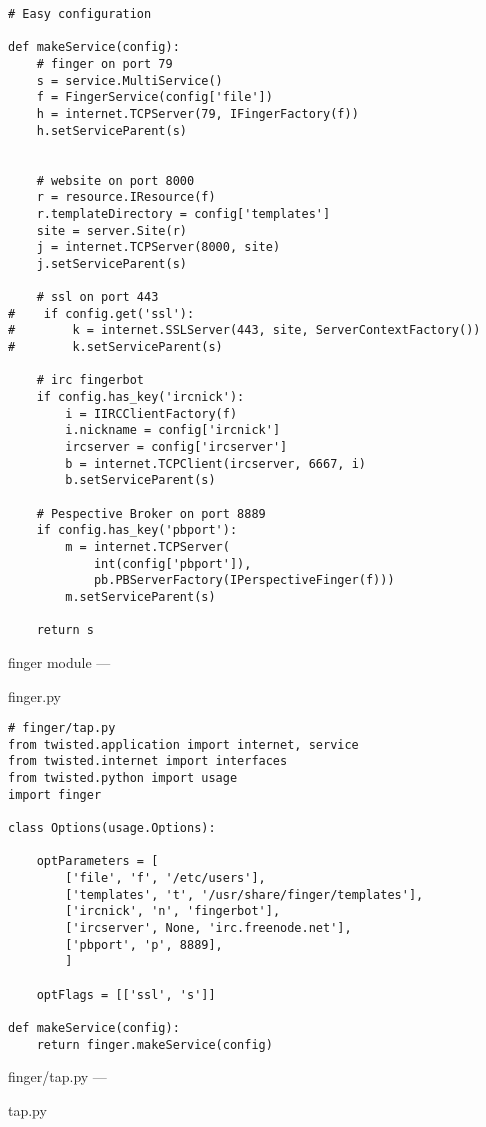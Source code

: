 \begin{verbatim}
# Easy configuration

def makeService(config):
    # finger on port 79
    s = service.MultiService()
    f = FingerService(config['file'])
    h = internet.TCPServer(79, IFingerFactory(f))
    h.setServiceParent(s)


    # website on port 8000
    r = resource.IResource(f)
    r.templateDirectory = config['templates']
    site = server.Site(r)
    j = internet.TCPServer(8000, site)
    j.setServiceParent(s)

    # ssl on port 443
#    if config.get('ssl'):
#        k = internet.SSLServer(443, site, ServerContextFactory())
#        k.setServiceParent(s)

    # irc fingerbot
    if config.has_key('ircnick'):
        i = IIRCClientFactory(f)
        i.nickname = config['ircnick']
        ircserver = config['ircserver']
        b = internet.TCPClient(ircserver, 6667, i)
        b.setServiceParent(s)

    # Pespective Broker on port 8889
    if config.has_key('pbport'):
        m = internet.TCPServer(
            int(config['pbport']),
            pb.PBServerFactory(IPerspectiveFinger(f)))
        m.setServiceParent(s)

    return s
\end{verbatim}\parbox[b]{\linewidth}{\begin{center}finger module --- \begin{em}finger.py\end{em}\end{center}}\begin{verbatim}
# finger/tap.py
from twisted.application import internet, service
from twisted.internet import interfaces
from twisted.python import usage
import finger

class Options(usage.Options):

    optParameters = [
        ['file', 'f', '/etc/users'],
        ['templates', 't', '/usr/share/finger/templates'],
        ['ircnick', 'n', 'fingerbot'],
        ['ircserver', None, 'irc.freenode.net'],
        ['pbport', 'p', 8889],
        ]

    optFlags = [['ssl', 's']]

def makeService(config):
    return finger.makeService(config)
\end{verbatim}\parbox[b]{\linewidth}{\begin{center}finger/tap.py --- \begin{em}tap.py\end{em}\end{center}}


